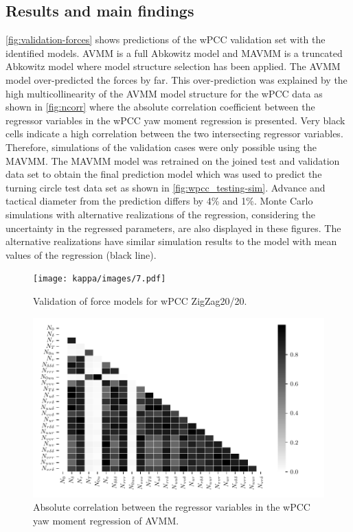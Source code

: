 \subsection*{Results and main findings}
\autoref{fig:validation-forces} shows predictions of the wPCC validation set with the identified models. AVMM is a full Abkowitz model and MAVMM is a truncated Abkowitz model where model structure selection has been applied. The AVMM model over-predicted the forces by far. 
This over-prediction was  explained by the high multicollinearity of the AVMM model structure for the wPCC data as shown in \autoref{fig:ncorr}  where the absolute correlation coefficient between the regressor variables in the wPCC yaw moment regression is presented. Very black cells indicate a high correlation between the two intersecting regressor variables.
Therefore, simulations of the validation cases were only possible using the MAVMM. 
The MAVMM model was retrained on the joined test and validation data set to obtain the final prediction model which was used to predict the turning circle test data set as shown in \autoref{fig:wpcc_testing-sim}. Advance and tactical diameter \cite{imoStandardsShipManoeuvrability2002} from the prediction differs by 4\% and 1\%. Monte Carlo simulations with alternative realizations of the regression, considering the uncertainty in the regressed parameters, are also displayed in these figures. The alternative realizations have similar simulation results to the model with mean values of the regression (black line).
\begin{figure}[h]
\centering
\texttt{[image: kappa/images/7.pdf]}
\caption{Validation of force models for wPCC ZigZag20/20.}\label{fig:validation-forces}
\end{figure}
\begin{figure}[h]
\centering
\includegraphics[width=1.0\textwidth]{kappa/images/10.pdf}

    \caption{Absolute correlation between the regressor variables in the wPCC yaw moment regression of AVMM.}

\label{fig:ncorr}
\end{figure}
